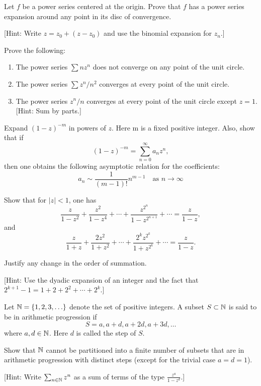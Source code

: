 \begin{exercise}
Let $f$ be a power series centered at the origin. Prove that $f$ has a power series expansion around any point in its disc of convergence.

[Hint: Write $z = z_0 + (z - z_0)$ and use the binomial expansion for $z_n$.]
\end{exercise}

\begin{exercise}
Prove the following:
\begin{enumerate}[label=(\alph*)]
\item The power series $\sum nz^n$ does not converge on any point of the unit circle.
\item The power series $\sum z^n/n^2$ converges at every point of the unit circle.
\item The power series $z^n/n$ converges at every point of the unit circle except $z = 1$. [Hint: Sum by parts.]
\end{enumerate}
\end{exercise}

\begin{exercise}
Expand $(1 - z)^{-m}$ in powers of $z$. Here m is a fixed positive integer. Also, show that if $$(1-z)^{-m} = \sum_{n=0}^\infty a_nz^n,$$ then one obtains the following asymptotic relation for the coefficients: $$a_n\sim \frac{1}{(m-1)!}n^{m-1} \quad \text{as } n\to\infty$$
\end{exercise}

\begin{exercise}
Show that for $|z| < 1$, one has $$\frac{z}{1-z^2} + \frac{z^2}{1-z^4} + \cdots + \frac{z^{2^n}}{1-z^{2^{n+1}}} + \cdots = \frac{z}{1-z},$$ and $$\frac{z}{1+z} + \frac{2z^2}{1+z^2} + \cdots + \frac{2^kz^{2^k}}{1+z^{2^k}} + \cdots = \frac{z}{1-z}.$$

Justify any change in the order of summation.

[Hint: Use the dyadic expansion of an integer and the fact that $2^{k+1} - 1=1+2+2^2 + \cdots + 2^k$.]
\end{exercise}

\begin{exercise}
Let $\mathbb{N} = \{1, 2, 3, \ldots\}$ denote the set of positive integers. A subset $S \subset \mathbb{N}$ is said to be in arithmetic progression if $$S = {a, a + d, a + 2d, a + 3d, \ldots}$$ where $a, d \in \mathbb{N}$. Here $d$ is called the step of $S$.

Show that $\mathbb{N}$ cannot be partitioned into a finite number of subsets that are in arithmetic progression with distinct steps (except for the trivial case $a = d = 1$).

[Hint: Write $\sum_{n\in\mathbb{N}} z^n$ as a sum of terms of the type $\frac{z^a}{1-z^d}$.]
\end{exercise}

